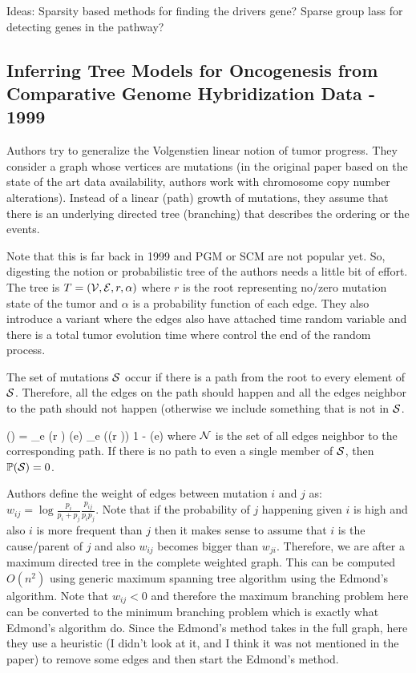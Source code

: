 \documentclass[]{article}
\begin{document}
	
	
	Ideas: 
	Sparsity based methods for finding the drivers gene?
	Sparse group lass for detecting genes in the pathway?  
	
	
	\subsection{Inferring Tree Models for Oncogenesis from Comparative Genome Hybridization Data - 1999}
	Authors try to generalize the Volgenstien linear notion of tumor progress. 
	They consider a graph whose vertices are mutations (in the original paper based on the state of the art data availability, authors work with chromosome copy number alterations). 
	Instead of a linear (path) growth of mutations, they assume that there is an underlying directed tree (branching) that describes the ordering or the events. 
	
	Note that this is far back in 1999 and PGM or SCM are not popular yet. 
	So, digesting the notion or probabilistic tree of the authors needs a little bit of effort. 
	The tree is $T = ({\cal V}, {\cal E}, r, \alpha)$ where $r$ is the root representing no/zero mutation state of the tumor and $\alpha$ is a probability function of each edge. 
	They also introduce a variant where the edges also have attached time random variable and there is a total tumor evolution time where control the end of the random process. 
	
	The set of mutations ${\cal S}$ occur if there is a path from the root to every element of ${\cal S}$. 
	Therefore, all the edges on the path should happen and all the edges neighbor to the path should not happen (otherwise we include something that is not in ${\cal S}$. 
	
	\be 
	\pr (\cS) = \prod_{e \in {}(r \rightarrow \cS)} \alpha(e) \prod_{e \in \cN((r \rightarrow \cS))} 1 - \alpha(e)
	\ee 
	where ${\cal N}$ is the set of all edges neighbor to the corresponding path. 	
	If there is no path to even a single member of ${\cal S}$, then $\mathbb{P}({\cal S}) = 0$.
	
	Authors define the weight of edges between mutation $i$ and $j$ as: $w_{ij} = \log \frac{p_i}{p_i + p_j} \frac{p_{ij}}{p_i p_j}$.
	Note that if the probability of $j$ happening given $i$ is high and also $i$ is more frequent than $j$ then it makes sense to assume that $i$ is the cause/parent of $j$ and also $w_{ij}$ becomes bigger than $w_{ji}$.
	Therefore, we are after a maximum directed tree in the complete weighted graph. 
	This can be computed $O(n^2)$ using generic maximum spanning tree algorithm using the Edmond's algorithm. 
	Note that $w_{ij} < 0$ and therefore the maximum branching problem here can be converted to the minimum branching problem which is exactly what Edmond's algorithm do. 
	Since the Edmond's method takes in the full graph, here they use a heuristic (I didn't look at it, and I think it was not mentioned in the paper) to remove some edges and then start the Edmond's method. 
	
\end{document}
